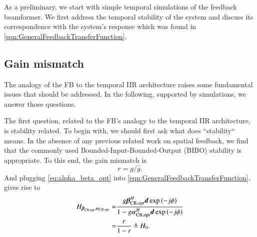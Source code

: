 As a preliminary, we start with simple temporal simulations of the feedback beamformer.
We first address the temporal stability of the system and discuss its correspondence with the system's response which was found in \eqref{eqn:GeneralFeedbackTransferFunction}.
\subsection{Gain mismatch}
The analogy of the FB to the temporal IIR architecture raises some fundamental issues that should be addressed.
In the following, supported by simulations, we answer those questions.
\par The first question, related to the FB's analogy to the temporal IIR architecture, is stability related.
To begin with, we should first ask what does ``stability`` means.
In the absence of any previous related work on spatial feedback, we find that the commonly used Bounded-Input-Bounded-Output (BIBO) stability is appropriate. 
To this end, the gain mismatch is
\begin{equation}
    r=g/\hat{g}.
\end{equation}
And plugging \eqref{eq:alpha_beta_opt} into \eqref{eqn:GeneralFeedbackTransferFunction}, gives rise to
\begin{equation}\label{eq:SF_CB_gainMismatch}
    {
        \begin{split}
            H_{\boldsymbol{\beta}_{\text{CB,opt}},\boldsymbol{\alpha}_{\text{CB,opt}}}
            = &\frac{
            g\boldsymbol{\beta}_{\text{CB,opt}}^{H}\boldsymbol{d}\exp{\left({-j\phi}\right)}
            }{
            1 - g\boldsymbol{\alpha}_{\text{CB,opt}}^{H}\boldsymbol{d}\exp{\left({-j\phi}\right)}
            }\\
            = & \frac{r}{1-r} \triangleq H_{0}.
        \end{split}
    }
\end{equation}
